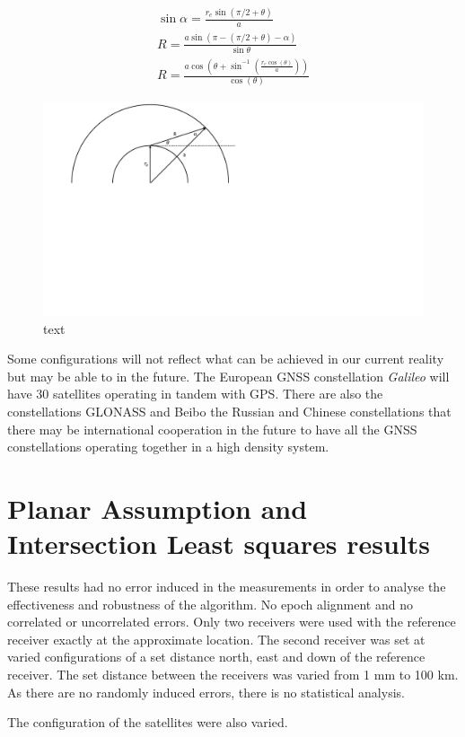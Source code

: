 \begin{eqnarray}
\sin\alpha = \frac{r_e\sin(\pi/2+\theta)}{a}\\
R = \frac{a\sin(\pi-(\pi/2+\theta)-\alpha)}{\sin\theta}\\
R = \frac{a\cos\left( \theta+\sin^{-1}\left( \frac{r_e\cos(\theta)}{a} \right) \right)}{\cos(\theta)}
\end{eqnarray}
\begin{figure}
\centering
\caption{text}
\label{fig:orbit_distance}
\includegraphics[trim={0 11cm 16cm 0},clip,width = 0.7\linewidth]{ChapterExperiments/Figures/orbit_distance}
\end{figure}

Some configurations will not reflect what can be achieved in our current reality but may be able to in the future. The European GNSS constellation \textit{Galileo} will have 30 satellites operating in tandem with GPS. There are also the constellations GLONASS and Beibo the Russian and Chinese constellations that there may be international cooperation in the future to have all the GNSS constellations operating together in a high density system.


\section{Planar Assumption and Intersection Least squares results}
These results had no error induced in the measurements in order to analyse the effectiveness and robustness of the algorithm. No epoch alignment and no correlated or uncorrelated errors. Only two receivers were used with the reference receiver exactly at the approximate location. The second receiver was set at varied configurations of a set distance north, east and down of the reference receiver. The set distance between the receivers was varied from 1 mm to 100 km. As there are no randomly induced errors, there is no statistical analysis.

The configuration of the satellites were also varied. 

